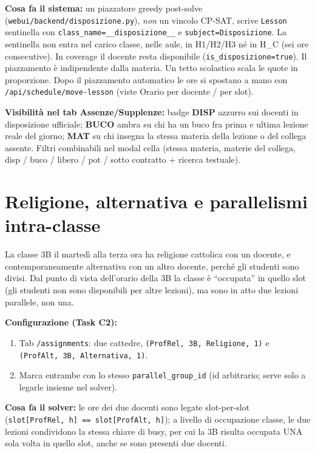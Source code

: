 \textbf{Cosa fa il sistema:} un piazzatore greedy
post-solve (\texttt{webui/backend/disposizione.py}),
\emph{non} un vincolo CP-SAT, scrive
\texttt{Lesson} sentinella con
\texttt{class\_name=\_\_disposizione\_\_} e
\texttt{subject=Disposizione}. La sentinella non entra
nel carico classe, nelle aule, in H1/H2/H3 n\'e in H\_C
(sei ore consecutive). In coverage il docente resta
disponibile (\texttt{is\_disposizione=true}). Il
piazzamento \`e indipendente dalla materia. Un tetto
scolastico scala le quote in proporzione. Dopo il
piazzamento automatico le ore si spostano a mano con
\texttt{/api/schedule/move-lesson} (viste Orario per
docente / per slot).

\textbf{Visibilit\`a nel tab Assenze/Supplenze:} badge
\textbf{DISP} azzurro sui docenti in disposizione
ufficiale; \textbf{BUCO} ambra su chi ha un buco fra
prima e ultima lezione reale del giorno; \textbf{MAT} su
chi insegna la stessa materia della lezione o del
collega assente. Filtri combinabili nel modal cella
(stessa materia, materie del collega, disp / buco /
libero / pot / sotto contratto + ricerca testuale).

\section{Religione, alternativa e parallelismi intra-classe}

La classe 3B il marted\`i alla terza ora ha religione
cattolica con un docente, e contemporaneamente alternativa
con un altro docente, perch\'e gli studenti sono divisi.
Dal punto di vista dell'orario della 3B la classe \`e
``occupata'' in quello slot (gli studenti non sono
disponibili per altre lezioni), ma sono in atto due lezioni
parallele, non una.

\textbf{Configurazione (Task C2):}
\begin{enumerate}
\item Tab \texttt{/assignments}: due cattedre,
\texttt{(ProfRel, 3B, Religione, 1)} e
\texttt{(ProfAlt, 3B, Alternativa, 1)}.
\item Marca entrambe con lo stesso
\texttt{parallel\_group\_id} (id arbitrario; serve solo a
legarle insieme nel solver).
\end{enumerate}

\textbf{Cosa fa il solver:} le ore dei due docenti sono
legate slot-per-slot
(\texttt{slot[ProfRel, h] == slot[ProfAlt, h]}); a livello
di occupazione classe, le due lezioni condividono la stessa
chiave di busy, per cui la 3B risulta occupata UNA sola
volta in quello slot, anche se sono presenti due docenti.

